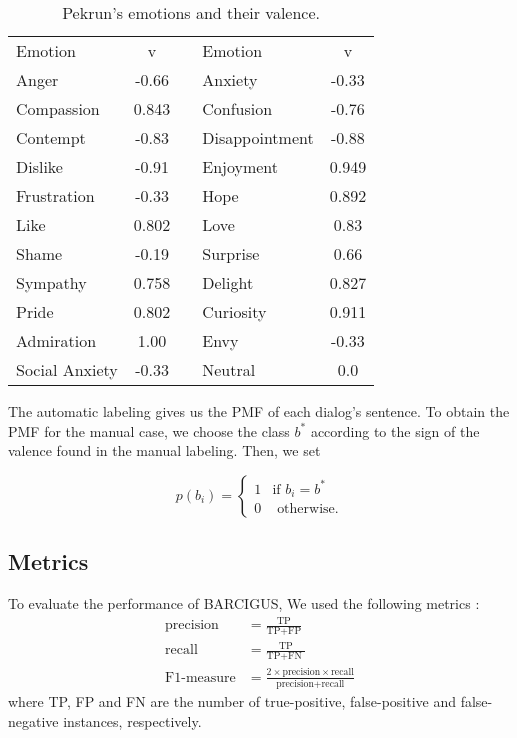 \documentclass[3p,times,preprint]{elsarticle}
\begin{document}
\begin{table}[t!]
\caption{Pekrun's emotions and their valence.}
\centering
\begin{tabularx}{0.75\textwidth}{XSp{0.5cm}XS}
\toprule
Emotion&v&&Emotion&v\\
 
Anger &	-0.66 &&	Anxiety &	-0.33\\
Compassion & 0.843 &&	Confusion &	-0.76\\
Contempt &	-0.83 &&	Disappointment &	-0.88\\
Dislike &	-0.91 &&	Enjoyment &	0.949\\
Frustration &	-0.33 &&	Hope &	0.892\\
Like &	0.802 &&	Love &	0.83\\
Shame &	-0.19 &&	Surprise &	0.66\\
Sympathy &	0.758 &&	Delight &	0.827\\
Pride &	0.802 &&	Curiosity &	0.911\\
Admiration &	1.00 &&	Envy &	-0.33\\
Social Anxiety &	-0.33 &&	Neutral &	0.0\\
\bottomrule
\end{tabularx}
\label{table-mapping}
\end{table}






The automatic labeling gives us the PMF of each dialog's sentence. To obtain the PMF for the manual case, we choose the class $b^*$ according to the sign of the valence found in the manual labeling. Then, we set 

\begin{equation}
p(b_i) = \begin{cases}
        1 & \text{if } b_i = b^*\\
        0 & \text{  otherwise.}
    \end{cases}
\end{equation}

\subsection{Metrics}
To evaluate the performance of BARCIGUS, We used the following metrics \citep{Verbiest2015}: %
\begin{align}
\label{ecuacion-precision}
\text{precision} &= \frac{ \text{TP} } { \text{TP} +  \text{FP} }\\
\label{ecuacion-recall}
\text{recall}&=\frac { \text{TP} } { \text{TP} + \text{FN }} \\
\label{ecuacion-fmeasure}
\text{F1-measure} &= \frac{2 \times \text{precision} \times \text{recall} } {\text{precision} + \text{recall} }
\end{align}
where TP, FP and FN are the number of true-positive, false-positive and false-negative instances, respectively.
\end{document}
